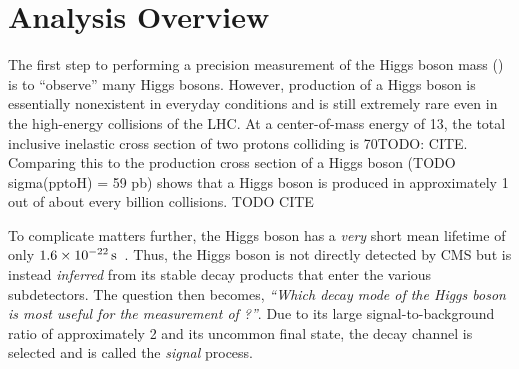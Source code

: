 \section{Analysis Overview}
\label{sec:analysis_overview}
The first step to performing a precision measurement of the Higgs boson mass (\mH) is to ``observe'' many Higgs bosons.
However, production of a Higgs boson is essentially nonexistent in everyday conditions and is still extremely rare even in the high-energy \pp collisions of the LHC.
At a center-of-mass energy of 13\TeV, the total inclusive inelastic cross section of two protons colliding is 70\mb TODO: CITE.
Comparing this to the production cross section of a Higgs boson (TODO sigma(pptoH) = 59 pb) shows that a Higgs boson is produced in approximately 1 out of about every billion \pp collisions.  TODO CITE

To complicate matters further, the Higgs boson has a \emph{very} short mean lifetime of only $1.6 \times \text{10}^\text{$-$22}\,\text{s}$~\cite{pdg}.
Thus, the Higgs boson is not directly detected by CMS but is instead \emph{inferred} from its stable decay products that enter the various subdetectors.
The question then becomes, \emph{``Which decay mode of the Higgs boson is most useful for the measurement of \mH?''}.
Due to its large signal-to-background ratio of approximately 2 and its uncommon final state, the \hzzfourl decay channel is selected and is called the \emph{signal} process.

